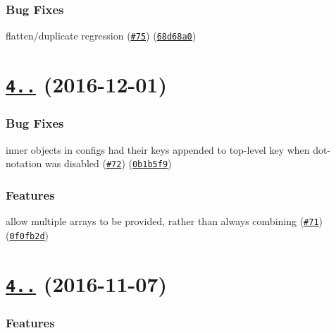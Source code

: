\subsubsection*{Bug Fixes}


\begin{DoxyItemize}
\item flatten/duplicate regression (\href{https://github.com/yargs/yargs-parser/issues/75}{\tt \#75}) (\href{https://github.com/yargs/yargs-parser/commit/68d68a0}{\tt 68d68a0})
\end{DoxyItemize}

\label{_4.2.0}%
 \section*{\href{https://github.com/yargs/yargs-parser/compare/v4.1.0...v4.2.0}{\tt 4..} (2016-\/12-\/01)}

\subsubsection*{Bug Fixes}


\begin{DoxyItemize}
\item inner objects in configs had their keys appended to top-\/level key when dot-\/notation was disabled (\href{https://github.com/yargs/yargs-parser/issues/72}{\tt \#72}) (\href{https://github.com/yargs/yargs-parser/commit/0b1b5f9}{\tt 0b1b5f9})
\end{DoxyItemize}

\subsubsection*{Features}


\begin{DoxyItemize}
\item allow multiple arrays to be provided, rather than always combining (\href{https://github.com/yargs/yargs-parser/issues/71}{\tt \#71}) (\href{https://github.com/yargs/yargs-parser/commit/0f0fb2d}{\tt 0f0fb2d})
\end{DoxyItemize}

\label{_4.1.0}%
 \section*{\href{https://github.com/yargs/yargs-parser/compare/v4.0.2...v4.1.0}{\tt 4..} (2016-\/11-\/07)}

\subsubsection*{Features}


